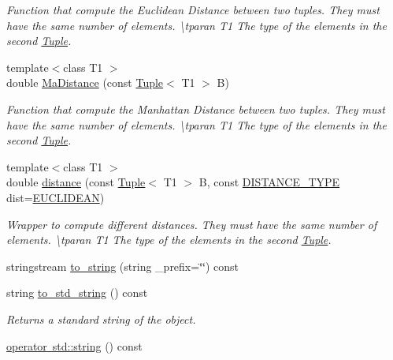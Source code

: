 \begin{DoxyCompactItemize}
\begin{DoxyCompactList}\small\item\em Function that compute the Euclidean Distance between two tuples. They must have the same number of elements. \textbackslash{}tparan T1 The type of the elements in the second \mbox{\hyperlink{class_tuple}{Tuple}}. \end{DoxyCompactList}\item 
{\footnotesize template$<$class T1 $>$ }\\double \mbox{\hyperlink{class_tuple_ac668269743d9be71769c9b4a424c785f}{Ma\+Distance}} (const \mbox{\hyperlink{class_tuple}{Tuple}}$<$ T1 $>$ B)
\begin{DoxyCompactList}\small\item\em Function that compute the Manhattan Distance between two tuples. They must have the same number of elements. \textbackslash{}tparan T1 The type of the elements in the second \mbox{\hyperlink{class_tuple}{Tuple}}. \end{DoxyCompactList}\item 
{\footnotesize template$<$class T1 $>$ }\\double \mbox{\hyperlink{class_tuple_af47521571361439c96392dee70a79cc7}{distance}} (const \mbox{\hyperlink{class_tuple}{Tuple}}$<$ T1 $>$ B, const \mbox{\hyperlink{maths_8hh_ac50d7263b1cae8691420b86282b27f90}{D\+I\+S\+T\+A\+N\+C\+E\+\_\+\+T\+Y\+PE}} dist=\mbox{\hyperlink{maths_8hh_ac50d7263b1cae8691420b86282b27f90a81bbbc4428c3ff3f1327e94957e2b5f1}{E\+U\+C\+L\+I\+D\+E\+AN}})
\begin{DoxyCompactList}\small\item\em Wrapper to compute different distances. They must have the same number of elements. \textbackslash{}tparan T1 The type of the elements in the second \mbox{\hyperlink{class_tuple}{Tuple}}. \end{DoxyCompactList}\item 
stringstream \mbox{\hyperlink{class_tuple_a029b06891c82353ae40c13199830e90a}{to\+\_\+string}} (string \+\_\+prefix=\char`\"{}\char`\"{}) const
\item 
string \mbox{\hyperlink{class_tuple_a2c8e5f6fb1abb2b11ab222b7ce772569}{to\+\_\+std\+\_\+string}} () const
\begin{DoxyCompactList}\small\item\em Returns a standard string of the object. \end{DoxyCompactList}\item 
\mbox{\hyperlink{class_tuple_a9a4516890830c7a8bf96c9325718c8c3}{operator std\+::string}} () const

\end{DoxyCompactItemize}
